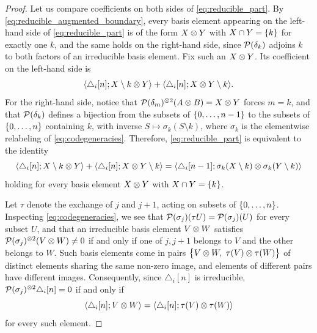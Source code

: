 \begin{proof}
	Let us compare coefficients on both sides of \eqref{eq:reducible_part}.
	By \cref{eq:reducible_augmented_boundary}, every basis element appearing on the left-hand side of \cref{eq:reducible_part} is of the form $X \ot Y$ with $X \cap Y = \set{k}$ for exactly one $k$, and the same holds on the right-hand side, since $\cP(\delta_k)$ adjoins $k$ to both factors of an irreducible basis element.
	Fix such an $X \ot Y$.
	Its coefficient on the left-hand side is
	\[
	\coeff{\triangle_i[n]}{X \setminus k \ot Y} + \coeff{\triangle_i[n]}{X \ot Y \setminus k}.
	\]
	For the right-hand side, notice that $\cP(\delta_m)^{\ot 2}(A \ot B) = X \ot Y$ forces $m = k$, and that $\cP(\delta_k)$ defines a bijection from the subsets of $\set{0,\dots,n-1}$ to the subsets of $\set{0,\dots,n}$ containing $k$, with inverse $S \mapsto \sigma_k(S \setminus k)$, where $\sigma_k$ is the elementwise relabeling of \cref{eq:codegeneracies}.
	Therefore, \cref{eq:reducible_part} is equivalent to the identity
	\begin{equation}\label{eq:coefficient_comparison}
		\coeff{\triangle_i[n]}{X \setminus k \ot Y} + \coeff{\triangle_i[n]}{X \ot Y \setminus k} =
		\coeff{\triangle_i[n-1]}{\sigma_k(X \setminus k) \ot \sigma_k(Y \setminus k)}
	\end{equation}
	holding for every basis element $X \ot Y$ with $X \cap Y = \set{k}$.

	Let $\tau$ denote the exchange of $j$ and $j+1$, acting on subsets of $\set{0,\dots,n}$.
	Inspecting \cref{eq:codegeneracies}, we see that $\cP(\sigma_j)(\tau U) = \cP(\sigma_j)(U)$ for every subset $U$, and that an irreducible basis element $V \ot W$ satisfies $\cP(\sigma_j)^{\ot 2}(V \ot W) \neq 0$ if and only if one of $j,j+1$ belongs to $V$ and the other belongs to $W$.
	Such basis elements come in pairs $\set[\big]{V \ot W,\ \tau(V) \ot \tau(W)}$ of distinct elements sharing the same non-zero image, and elements of different pairs have different images.
	Consequently, since $\triangle_i[n]$ is irreducible, $\cP(\sigma_j)^{\ot 2}\triangle_i[n] = 0$ if and only if
	\begin{equation}\label{eq:swap}
		\coeff{\triangle_i[n]}{V \ot W} = \coeff{\triangle_i[n]}{\tau(V) \ot \tau(W)}
	\end{equation}
	for every such element.


\end{proof}
